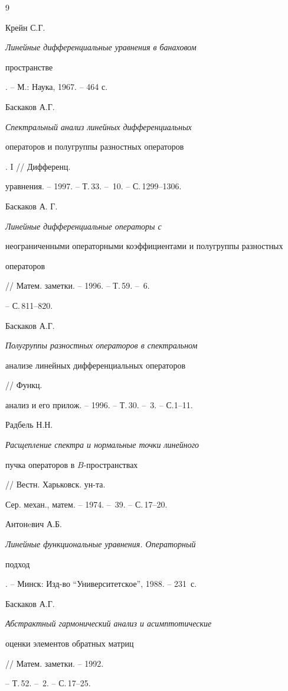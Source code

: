 \begin{thebibliography}{9} 


 




Крейн С.Г. {\em Линейные дифференциальные уравнения в банаховом 


пространстве}. -- М.: Наука, 1967. -- 464 с. 




Баскаков А.Г. {\em Спектральный анализ линейных дифференциальных 


операторов и полугруппы разностных операторов}. I // Дифференц. 


уравнения. -- 1997. -- Т.\,33. -- \No\,10. -- С.\,1299--1306. 




Баскаков А. Г. {\em Линейные дифференциальные операторы с 


неограниченными операторными коэффициентами и полугруппы разностных 


операторов} // Матем. заметки. -- 1996. -- Т.\,59. -- \No\,6. 


-- С.\,811--820. 




Баскаков А.Г. {\em Полугруппы разностных операторов в спектральном 


анализе линейных дифференциальных операторов} // Функц. 


анализ и его прилож. -- 1996. -- Т.\,30. -- \No\,3. -- С.1--11. 




Радбель Н.Н. {\em Расщепление спектра и нормальные точки линейного 


пучка операторов в $B$-пространствах} // Вестн. Харьковск. ун-та. 


Сер. механ., матем. -- 1974. -- \No\,39. -- С.\,17--20. 




Антонeвич А.Б. {\em Линейные функциональные уравнения. Операторный 


подход}. -- Минск: Изд-во ``Университетское'', 1988. -- 231~с. 




Баскаков А.Г. {\em Абстрактный гармонический анализ и асимптотические 


оценки элементов обратных матриц} // Матем. заметки. -- 1992. 


-- Т.\,52. -- \No\,2. -- С.\,17--25. 


 


\end{thebibliography} 


 


\vskip 2cm 


 








 


\label{end} 


 


